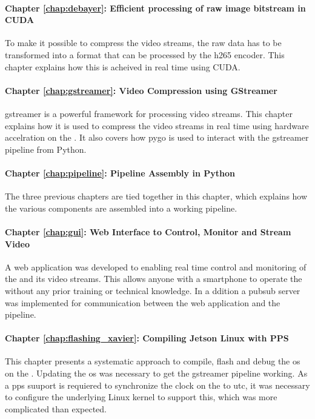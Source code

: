 \paragraph{Chapter \ref{chap:debayer}: Efficient processing of raw image bitstream in CUDA}
To make it possible to compress the video streams, the raw data has to be transformed into a format that can be processed by the \gls{h265} encoder.
This chapter explains how this is acheived in real time using CUDA.

\paragraph{Chapter \ref{chap:gstreamer}: Video Compression using GStreamer}
\gls{gstreamer} is a powerful framework for processing video streams.
This chapter explains how it is used to compress the video streams in real time using hardware accelration on the \jx.
It also covers how \gls{pygo} is used to interact with the \gls{gstreamer} pipeline from Python.

\paragraph{Chapter \ref{chap:pipeline}: Pipeline Assembly in Python}
The three previous chapters are tied together in this chapter, which explains how the various components are assembled into a working pipeline.

\paragraph{Chapter \ref{chap:gui}: Web Interface to Control, Monitor and Stream Video}
A web application was developed to enabling real time control and monitoring of the \sr and its video streams.
This allows anyone with a smartphone to operate the \sr without any prior training or technical knowledge.
In a ddition a \gls{pubsub} server was implemented for communication between the web application and the pipeline.

\paragraph{Chapter \ref{chap:flashing_xavier}: Compiling Jetson Linux with PPS}
This chapter presents a systematic approach to compile, flash and debug the \gls{os} on the \jx.
Updating the \gls{os} was necessary to get the \gls{gstreamer} pipeline working.
As a \gls{pps} suuport is requiered  to synchronize the clock on the \jx to \gls{utc}, it was necessary to configure the underlying Linux kernel to support this, which was more complicated than expected.

